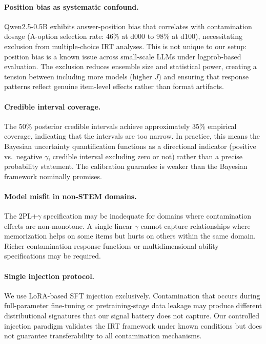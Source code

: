 \paragraph{Position bias as systematic confound.}
Qwen2.5-0.5B exhibits answer-position bias that correlates with contamination dosage (A-option selection rate: 46\% at d000 to 98\% at d100), necessitating exclusion from multiple-choice IRT analyses. This is not unique to our setup: position bias is a known issue across small-scale LLMs under logprob-based evaluation. The exclusion reduces ensemble size and statistical power, creating a tension between including more models (higher $J$) and ensuring that response patterns reflect genuine item-level effects rather than format artifacts.

\paragraph{Credible interval coverage.}
The 50\% posterior credible intervals achieve approximately 35\% empirical coverage, indicating that the intervals are too narrow. In practice, this means the Bayesian uncertainty quantification functions as a directional indicator (positive vs.\ negative $\gamma$, credible interval excluding zero or not) rather than a precise probability statement. The calibration guarantee is weaker than the Bayesian framework nominally promises.

\paragraph{Model misfit in non-STEM domains.}
The 2PL+$\gamma$ specification may be inadequate for domains where contamination effects are non-monotone. A single linear $\gamma$ cannot capture relationships where memorization helps on some items but hurts on others within the same domain. Richer contamination response functions or multidimensional ability specifications may be required.

\paragraph{Single injection protocol.}
We use LoRA-based SFT injection exclusively. Contamination that occurs during full-parameter fine-tuning or pretraining-stage data leakage may produce different distributional signatures that our signal battery does not capture. Our controlled injection paradigm validates the IRT framework under known conditions but does not guarantee transferability to all contamination mechanisms.

